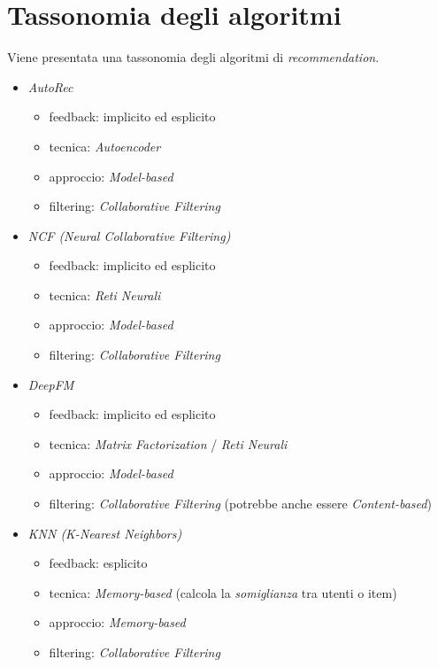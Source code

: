 \section{Tassonomia degli algoritmi}

Viene presentata una tassonomia degli algoritmi di \textit{recommendation}.

\begin{itemize}[label=\textbullet]

    \item \textit{AutoRec}
    \begin{itemize}
        \item feedback: implicito ed esplicito
        \item tecnica: \textit{Autoencoder}
        \item approccio: \textit{Model-based}
        \item filtering: \textit{Collaborative Filtering}
    \end{itemize}

    \item \textit{NCF (Neural Collaborative Filtering)}
    \begin{itemize}
        \item feedback: implicito ed esplicito
        \item tecnica: \textit{Reti Neurali}
        \item approccio: \textit{Model-based}
        \item filtering: \textit{Collaborative Filtering}
    \end{itemize}

    \item \textit{DeepFM}
    \begin{itemize}
        \item feedback: implicito ed esplicito
        \item tecnica: \textit{Matrix Factorization} / \textit{Reti Neurali}
        \item approccio: \textit{Model-based}
        \item filtering: \textit{Collaborative Filtering} (potrebbe anche essere \textit{Content-based})
    \end{itemize}

    \item \textit{KNN (K-Nearest Neighbors)}
    \begin{itemize}
        \item feedback: esplicito
        \item tecnica: \textit{Memory-based} (calcola la \textit{somiglianza} tra utenti o item)
        \item approccio: \textit{Memory-based}
        \item filtering: \textit{Collaborative Filtering}
    \end{itemize}


\end{itemize}
